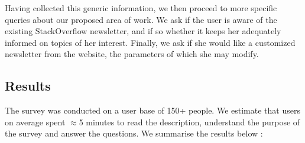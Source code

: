 \documentclass{sig-alternate-05-2015}
\begin{document}
Having collected this generic information, we then proceed to more specific queries about our proposed area of work. We ask if the user is aware of the existing StackOverflow newsletter, and if so whether it keeps her adequately informed on topics of her interest. Finally, we ask if she would like a customized newsletter from the website, the parameters of which she may modify. 

\subsection {Results}

The survey was conducted on a user base of 150+ people. We estimate that users on average spent  $\approx$5 minutes to read the description, understand the purpose of the survey and answer the questions. We summarise the results below : 
\end{document}
